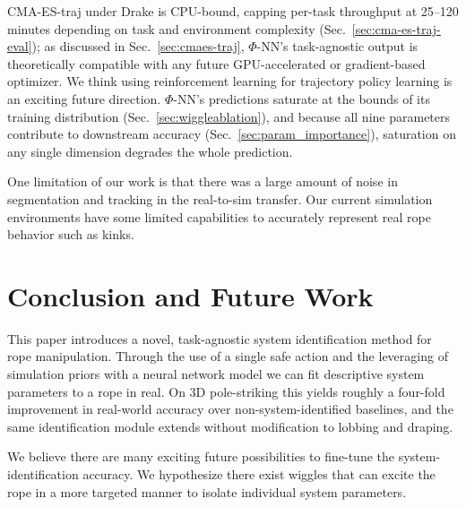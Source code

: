 \documentclass[conference]{IEEEtran}
\begin{document}
CMA-ES-traj under Drake is CPU-bound, capping per-task throughput at 25--120 minutes depending on task and environment complexity (Sec.~\ref{sec:cma-es-traj-eval}); as discussed in Sec.~\ref{sec:cmaes-traj}, $\Phi$-NN's task-agnostic output is theoretically compatible with any future GPU-accelerated or gradient-based optimizer. We think using reinforcement learning for trajectory policy learning is an exciting future direction. $\Phi$-NN's predictions saturate at the bounds of its training distribution (Sec.~\ref{sec:wiggleablation}), and because all nine parameters contribute to downstream accuracy (Sec.~\ref{sec:param_importance}), saturation on any single dimension degrades the whole prediction. 

One limitation of our work is that there was a large amount of noise in segmentation and tracking in the real-to-sim transfer. Our current simulation environments have some limited capabilities to accurately represent real rope behavior such as kinks. 
 
\section{Conclusion and Future Work}
 
This paper introduces a novel, task-agnostic system identification method for rope manipulation. Through the use of a single safe action and the leveraging of simulation priors with a neural network model we can fit descriptive system parameters to a rope in real. On 3D pole-striking this yields roughly a four-fold improvement in real-world accuracy over non-system-identified baselines, and the same identification module extends without modification to lobbing and draping.
 
We believe there are many exciting future possibilities to fine-tune the system-identification accuracy. We hypothesize there exist wiggles that can excite the rope in a more targeted manner to isolate individual system parameters.



\clearpage

\end{document}
